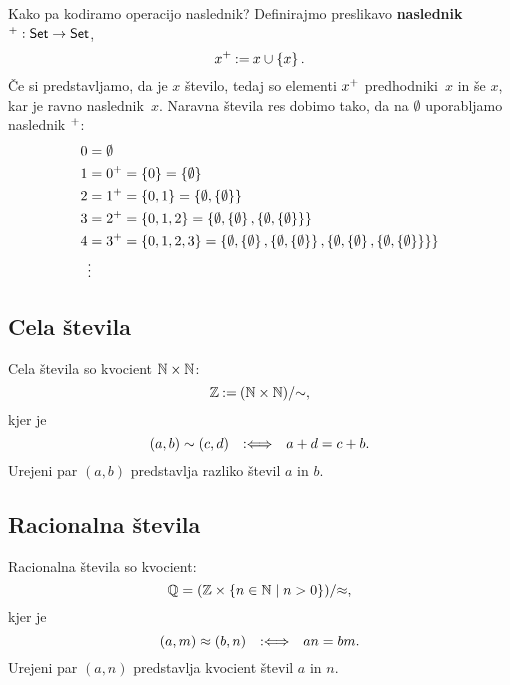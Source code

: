 Kako pa kodiramo operacijo naslednik? Definirajmo preslikavo \textbf{naslednik} ${}^{+} : \mathsf{Set} \to \mathsf{Set}$,
%
\begin{equation*}
  {x^{+}} \mathbin{{:}{=}} x \cup \left\{x\right\}.
\end{equation*}
%
Če si predstavljamo, da je $x$ število, tedaj so elementi ${x^{+}}$ predhodniki~$x$ in še $x$, kar je ravno naslednik~$x$.
Naravna števila res dobimo tako, da na $\emptyset$ uporabljamo naslednik ${{}^{+}}$:
%
\begin{align*}
    0 &= \emptyset \\
    1 &= {0^{+}} = \left\{ 0 \right\} = \left\{\emptyset\right\} \\
    2 &= {1^{+}} = \left\{0, 1\right\} = \left\{\emptyset, \left\{\emptyset\right\}\right\} \\
    3 &= {2^{+}} = \left\{0, 1, 2\right\} = \left\{\emptyset, \left\{\emptyset\right\}, \left\{\emptyset, \left\{\emptyset\right\}\right\}\right\} \\
    4 &= {3^{+}} = \left\{0, 1, 2, 3\right\} =
       \left\{\emptyset, \left\{\emptyset\right\}, \left\{\emptyset, \left\{\emptyset\right\}\right\},
            \left\{\emptyset, \left\{\emptyset\right\}, \left\{\emptyset, \left\{\emptyset\right\}\right\}\right\}\right\} \\
      &\vdots
\end{align*}

\subsection{Cela števila}

Cela števila so kvocient $\mathbb{N} \times \mathbb{N}$:
%
\begin{equation*}
    \mathbb{Z} \mathbin{{:}{=}} (\mathbb{N} \times \mathbb{N})/{\sim},
\end{equation*}
%
kjer je
%
\begin{equation*}
  (a,b) \sim (c,d) \quad {{:}{\Longleftrightarrow}}\quad a + d = c + b.
\end{equation*}
%
Urejeni par $(a, b)$ predstavlja razliko števil $a$ in $b$.


\subsection{Racionalna števila}

Racionalna števila so kvocient:
%
\begin{equation*}
  \mathbb{Q} = (\mathbb{Z} \times \left\{n \in \mathbb{N} \; \middle| \; n > 0\right\})/{\approx},
\end{equation*}
%
kjer je
%
\begin{equation*}
    (a,m) \approx (b,n) \quad {{:}{\Longleftrightarrow}}\quad a n = b m.
\end{equation*}
%
Urejeni par $(a, n)$ predstavlja kvocient števil $a$ in $n$.


